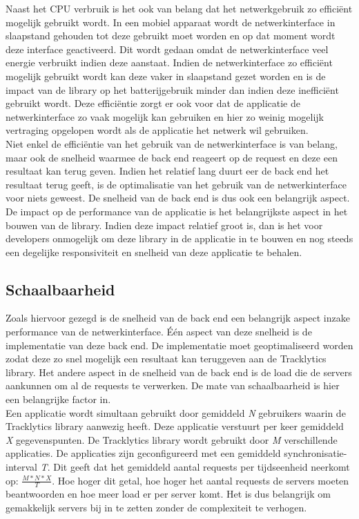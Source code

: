 \noindent Naast het CPU verbruik is het ook van belang dat het netwerkgebruik zo effici\"ent mogelijk gebruikt wordt. In een mobiel apparaat wordt de netwerkinterface in slaapstand gehouden tot deze gebruikt moet worden en op dat moment wordt deze interface geactiveerd. Dit wordt gedaan omdat de netwerkinterface veel energie verbruikt indien deze aanstaat. Indien de netwerkinterface zo effici\"ent mogelijk gebruikt wordt kan deze vaker in slaapstand gezet worden en is de impact van de library op het batterijgebruik minder dan indien deze ineffici\"ent gebruikt wordt. Deze effici\"entie zorgt er ook voor dat de applicatie de netwerkinterface zo vaak mogelijk kan gebruiken en hier zo weinig mogelijk vertraging opgelopen wordt als de applicatie het netwerk wil gebruiken. \\

\noindent Niet enkel de effici\"entie van het gebruik van de netwerkinterface is van belang, maar ook de snelheid waarmee de back end reageert op de request en deze een resultaat kan terug geven. Indien het relatief lang duurt eer de back end het resultaat terug geeft, is de optimalisatie van het gebruik van de netwerkinterface voor niets geweest. De snelheid van de back end is dus ook een belangrijk aspect. \\

\noindent De impact op de performance van de applicatie is het belangrijkste aspect in het bouwen van de library. Indien deze impact relatief groot is, dan is het voor developers onmogelijk om deze library in de applicatie in te bouwen en nog steeds een degelijke responsiviteit en snelheid van deze applicatie te behalen. 

\subsection{Schaalbaarheid}
Zoals hiervoor gezegd is de snelheid van de back end een belangrijk aspect inzake performance van de netwerkinterface. \'E\'en aspect van deze snelheid is de implementatie van deze back end. De implementatie moet geoptimaliseerd worden zodat deze zo snel mogelijk een resultaat kan teruggeven aan de Tracklytics library. Het andere aspect in de snelheid van de back end is de load die de servers aankunnen om al de requests te verwerken. De mate van schaalbaarheid is hier een belangrijke factor in. \\

\noindent Een applicatie wordt simultaan gebruikt door gemiddeld \textit{N} gebruikers waarin de Tracklytics library aanwezig heeft. Deze applicatie verstuurt per keer gemiddeld \textit{X} gegevenspunten. De Tracklytics library wordt gebruikt door \textit{M} verschillende applicaties. De applicaties zijn geconfigureerd met een gemiddeld synchronisatie-interval \textit{T}. Dit geeft dat het gemiddeld aantal requests per tijdseenheid neerkomt op: $\frac{M*N*X}{T}$. Hoe hoger dit getal, hoe hoger het aantal requests de servers moeten beantwoorden en hoe meer load er per server komt. Het is dus belangrijk om gemakkelijk servers bij in te zetten zonder de complexiteit te verhogen. \\



